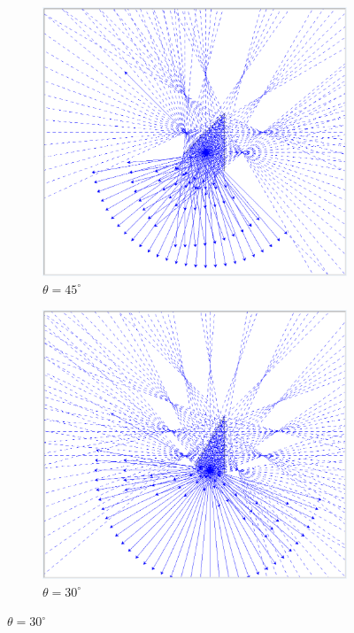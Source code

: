 \documentclass{zc-ust-hw}
\begin{document}
\begin{enumerate}
\begin{figure}[htpb]
      \medskip

      \begin{subfigure}{0.45\textwidth}
        \centering
        \includegraphics[width=\linewidth]{figures/45.png}
        \caption{$\theta=45^\circ$}
        \label{fig:sub3}
      \end{subfigure}
      \hfill
      \begin{subfigure}{0.45\textwidth}
        \centering
        \includegraphics[width=\linewidth]{figures/30.png}
        \caption{$\theta=30^\circ$}
        \label{fig:sub4}
      \end{subfigure}


\end{figure}
\end{enumerate}
\end{document}
